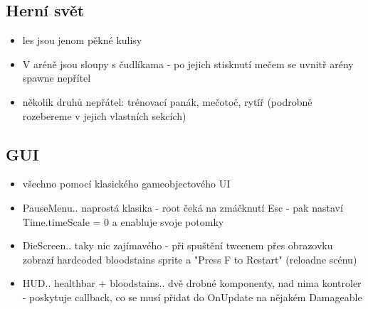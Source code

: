 \subsection{Herní svět}
\begin{itemize}
  \item les jsou jenom pěkné kulisy
  \item V aréně jsou sloupy s čudlíkama - po jejich stisknutí mečem se uvnitř arény spawne nepřítel
  \item několik druhů nepřátel: trénovací panák, mečotoč, rytíř (podrobně rozebereme v jejich vlastních sekcích)
\end{itemize}

\subsection{GUI}
\begin{itemize}
  \item všechno pomocí klasického gameobjectového UI
  \item PauseMenu.. naprostá klasika - root čeká na zmáčknutí Esc - pak nastaví Time.timeScale = 0 a enabluje svoje potomky
  \item DieScreen.. taky nic zajímavého - při spuštění tweenem přes obrazovku zobrazí hardcoded bloodstains sprite a "Press F to Restart" (reloadne scénu)
  \item HUD.. healthbar + bloodstains.. dvě drobné komponenty, nad nima kontroler - poskytuje callback, co se musí přidat do OnUpdate na nějakém Damageable
\end{itemize}


